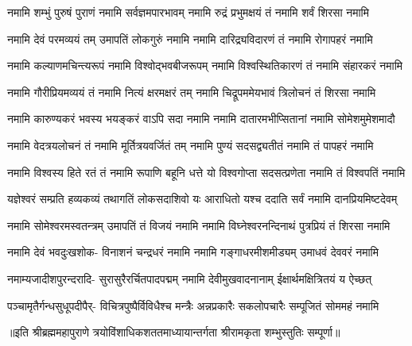 
\fourlineindentedshloka
{नमामि शम्भुं पुरुषं पुराणं}
{नमामि सर्वज्ञमपारभावम्}
{नमामि रुद्रं प्रभुमक्षयं तं}
{नमामि शर्वं शिरसा नमामि}%

\fourlineindentedshloka
{नमामि देवं परमव्ययं तम्}
{उमापतिं लोकगुरुं नमामि}
{नमामि दारिद्र्यविदारणं तं}
{नमामि रोगापहरं नमामि}%

\fourlineindentedshloka
{नमामि कल्याणमचिन्त्यरूपं}
{नमामि विश्वोद्भवबीजरूपम्}
{नमामि विश्वस्थितिकारणं तं}
{नमामि संहारकरं नमामि}%

\fourlineindentedshloka
{नमामि गौरीप्रियमव्ययं तं}
{नमामि नित्यं क्षरमक्षरं तम्}
{नमामि चिद्रूपममेयभावं}
{त्रिलोचनं तं शिरसा नमामि}%

\fourlineindentedshloka
{नमामि कारुण्यकरं भवस्य}
{भयङ्करं वाऽपि सदा नमामि}
{नमामि दातारमभीप्सितानां}
{नमामि सोमेशमुमेशमादौ}%

\fourlineindentedshloka
{नमामि वेदत्रयलोचनं तं}
{नमामि मूर्तित्रयवर्जितं तम्}
{नमामि पुण्यं सदसद्व्यतीतं}
{नमामि तं पापहरं नमामि}%

\fourlineindentedshloka
{नमामि विश्वस्य हिते रतं तं}
{नमामि रूपाणि बहूनि धत्ते}
{यो विश्वगोप्ता सदसत्प्रणेता}
{नमामि तं विश्वपतिं नमामि}%

\fourlineindentedshloka
{यज्ञेश्वरं सम्प्रति हव्यकव्यं}
{तथागतिं लोकसदाशिवो यः}
{आराधितो यश्च ददाति सर्वं}
{नमामि दानप्रियमिष्टदेवम्}%

\fourlineindentedshloka
{नमामि सोमेश्वरमस्वतन्त्रम्}
{उमापतिं तं विजयं नमामि}
{नमामि विघ्नेश्वरनन्दिनाथं}
{पुत्रप्रियं तं शिरसा नमामि}%

\fourlineindentedshloka
{नमामि देवं भवदुःखशोक-}
{विनाशनं चन्द्रधरं नमामि}
{नमामि गङ्गाधरमीशमीड्यम्}
{उमाधवं देववरं नमामि}%

\fourlineindentedshloka
{नमाम्यजादीशपुरन्दरादि-}
{सुरासुरैरर्चितपादपद्मम्}
{नमामि देवीमुखवादनानाम्}
{ईक्षार्थमक्षित्रितयं य ऐच्छत्}%

\fourlineindentedshloka
{पञ्चामृतैर्गन्धसुधूपदीपैर्-}
{विचित्रपुष्पैर्विविधैश्च मन्त्रैः}
{अन्नप्रकारैः सकलोपचारैः}
{सम्पूजितं सोममहं नमामि}%

॥इति श्रीब्रह्ममहापुराणे त्रयोविंशाधिकशततमाध्यायान्तर्गता श्रीरामकृता शम्भुस्तुतिः सम्पूर्णा॥

